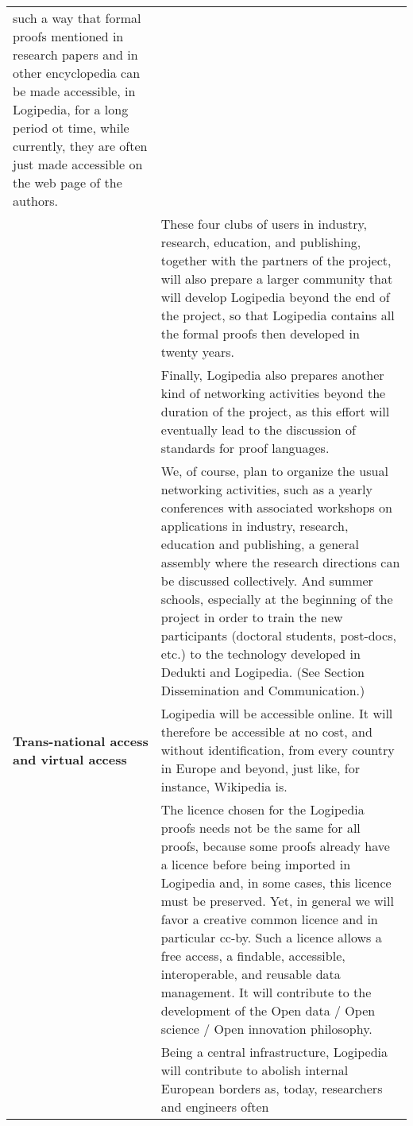 \begin{longtable}{|p{}|p{}|}
such a way that formal proofs mentioned in research papers and in
other encyclopedia can be made accessible, in Logipedia, for a long
period ot time, while currently, they are often just made accessible
on the web page of the authors.\\
&
\hspace{0.4cm}
These four clubs of users in industry, research, education, and
publishing, together with the partners of the project, will also
prepare a larger community that will develop Logipedia beyond the end
of the project, so that Logipedia contains all the formal proofs then
developed in twenty years.\\
&
\hspace{0.4cm}
Finally, Logipedia also prepares another kind of networking activities
beyond the duration of the project, as this effort will eventually
lead to the discussion of standards for proof languages.\\
&
\hspace{0.4cm}
We, of course, plan to organize the usual networking activities,
such as a yearly conferences with associated workshops on applications
in industry, research, education and publishing, a general assembly
where the research directions can be discussed collectively. And
summer schools, especially at the beginning of the project in order to
train the new participants (doctoral students, post-docs, etc.) to the
technology developed in Dedukti and Logipedia.
(See Section Dissemination and Communication.)\\  
\hline
{\bf Trans-national access and virtual access}
&
Logipedia will be accessible online. It will therefore be accessible
at no cost, and without identification, from every country in Europe
and beyond, just like, for instance, Wikipedia is.\\
&
\hspace{0.4cm}
The licence chosen for the Logipedia proofs needs not be the same for
all proofs, because some proofs already have a licence before being
imported in Logipedia and, in some cases, this licence must be
preserved.  Yet, in general we will favor a creative common licence
and in particular cc-by.  Such a licence allows a free
access, a findable, accessible, interoperable, and reusable
data management. It will contribute to the development of the Open
data / Open science / Open innovation philosophy.\\
&
\hspace{0.4cm}
Being a central infrastructure, Logipedia will contribute to abolish
internal European borders as, today, researchers and engineers often

\end{longtable}
